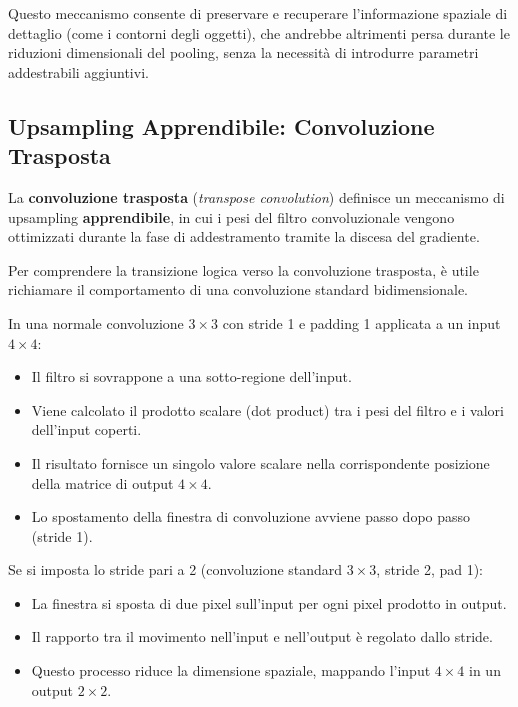 ﻿\documentclass[11pt, a4paper]{article}
\begin{document}
Questo meccanismo consente di preservare e recuperare l'informazione spaziale di dettaglio (come i contorni degli oggetti), che andrebbe altrimenti persa durante le riduzioni dimensionali del pooling, senza la necessità di introdurre parametri addestrabili aggiuntivi.

\newpage

\subsection{Upsampling Apprendibile: Convoluzione Trasposta}

La \textbf{convoluzione trasposta} (\emph{transpose convolution}) definisce un meccanismo di upsampling \textbf{apprendibile}, in cui i pesi del filtro convoluzionale vengono ottimizzati durante la fase di addestramento tramite la discesa del gradiente.

Per comprendere la transizione logica verso la convoluzione trasposta, è utile richiamare il comportamento di una convoluzione standard bidimensionale.


In una normale convoluzione $3 \times 3$ con stride 1 e padding 1 applicata a un input $4 \times 4$:
\begin{itemize}[noitemsep]
    \item Il filtro si sovrappone a una sotto-regione dell'input.
    \item Viene calcolato il prodotto scalare (dot product) tra i pesi del filtro e i valori dell'input coperti.
    \item Il risultato fornisce un singolo valore scalare nella corrispondente posizione della matrice di output $4 \times 4$.
    \item Lo spostamento della finestra di convoluzione avviene passo dopo passo (stride 1).
\end{itemize}

Se si imposta lo stride pari a 2 (convoluzione standard $3 \times 3$, stride 2, pad 1):
\begin{itemize}[noitemsep]
    \item La finestra si sposta di due pixel sull'input per ogni pixel prodotto in output.
    \item Il rapporto tra il movimento nell'input e nell'output è regolato dallo stride.
    \item Questo processo riduce la dimensione spaziale, mappando l'input $4 \times 4$ in un output $2 \times 2$.
\end{itemize}
\end{document}
